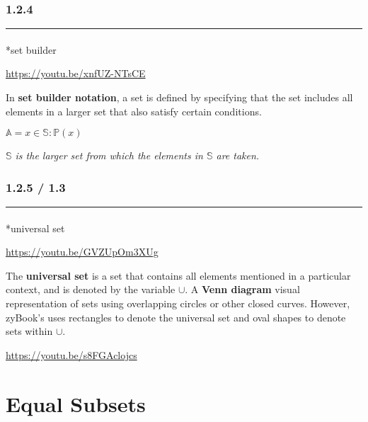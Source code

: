 \documentclass[
  letterpaper,
  DIV=11,
  numbers=noendperiod]{scrreprt}
\makeatletter
\let\oldparagraph\paragraph
\renewcommand{\paragraph}{
    \@ifstar
      \xxxParagraphStar
      \xxxParagraphNoStar
  }
\newcommand{\xxxParagraphStar}[1]{\oldparagraph*{#1}\mbox{}}
\newcommand{\xxxParagraphNoStar}[1]{\oldparagraph{#1}\mbox{}}
\makeatother
\begin{document}
\subsubsection*{1.2.4}\label{section-5}

\begin{center}\rule{0.5\linewidth}{0.5pt}\end{center}

\paragraph*{set builder}\label{set-builder}

\url{https://youtu.be/xnfUZ-NTsCE}

In {\textbf{set builder notation}}, a set is defined by specifying that
the set includes all elements in a larger set that also satisfy certain
conditions.

\(\mathbb{A} = { x \in \mathbb{S} : \mathbb{P}(x) }\)

\emph{\(\mathbb{S}\) is the larger set from which the elements in
\(\mathbb{S}\) are taken.}

\subsubsection*{1.2.5 / 1.3}\label{section-6}

\begin{center}\rule{0.5\linewidth}{0.5pt}\end{center}

\paragraph*{universal set}\label{universal-set}

\url{https://youtu.be/GVZUpOm3XUg}

The {\textbf{universal set}} is a set that contains all elements
mentioned in a particular context, and is denoted by the variable
\(\cup\). A {\textbf{Venn diagram}} visual representation of sets using
overlapping circles or other closed curves. However, zyBook's uses
rectangles to denote the universal set and oval shapes to denote sets
within \(\cup\).

\url{https://youtu.be/s8FGAclojcs}

\section{Equal Subsets}
\end{document}
